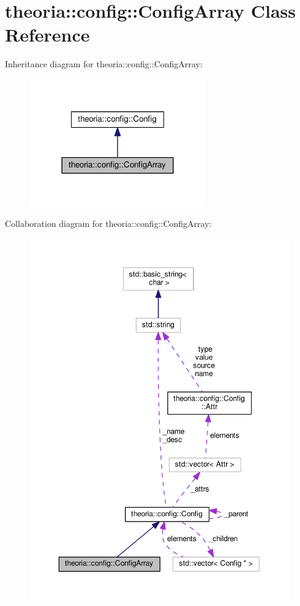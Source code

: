 \hypertarget{classtheoria_1_1config_1_1ConfigArray}{}\section{theoria\+:\+:config\+:\+:Config\+Array Class Reference}
\label{classtheoria_1_1config_1_1ConfigArray}


Inheritance diagram for theoria\+:\+:config\+:\+:Config\+Array\+:
\nopagebreak
\begin{figure}[H]
\begin{center}
\leavevmode
\includegraphics[width=216pt]{classtheoria_1_1config_1_1ConfigArray__inherit__graph}
\end{center}
\end{figure}


Collaboration diagram for theoria\+:\+:config\+:\+:Config\+Array\+:
\nopagebreak
\begin{figure}[H]
\begin{center}
\leavevmode
\includegraphics[width=350pt]{classtheoria_1_1config_1_1ConfigArray__coll__graph}
\end{center}
\end{figure}
